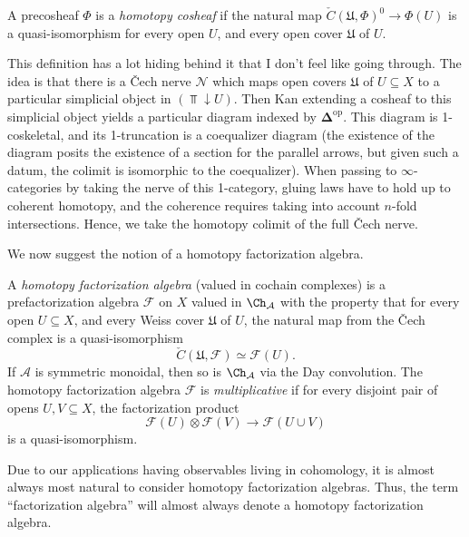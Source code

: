 \begin{definition}\label{dfn:6-1-11}
	A precosheaf $\Phi $ is a \emph{homotopy cosheaf} if the natural map $\check{C}(\mathfrak{U} ,\Phi )^0 \to \Phi (U)$ is a quasi-isomorphism for every open $U$, and every open cover $\mathfrak{U} $ of $U$.
\end{definition}

This definition has a lot hiding behind it that I don't feel like going through. The idea is that there is a \v{C}ech nerve $\mathcal{N} $ which maps open covers $\mathfrak{U} $ of $U\subseteq X$ to a particular simplicial object in $(\Top\downarrow U)$. Then Kan extending a cosheaf to this simplicial object yields a particular diagram indexed by $\boldsymbol{\Delta} ^{\mathrm{op}} $. This diagram is 1-coskeletal, and its 1-truncation is a coequalizer diagram (the existence of the diagram posits the existence of a section for the parallel arrows, but given such a datum, the colimit is isomorphic to the coequalizer). When passing to $\infty $-categories by taking the nerve of this 1-category, gluing laws have to hold up to coherent homotopy, and the coherence requires taking into account $n$-fold intersections. Hence, we take the homotopy colimit of the full \v{C}ech nerve.


We now suggest the notion of a homotopy factorization algebra.

\begin{definition}\label{dfn:6-1-13}
	A \emph{homotopy factorization algebra} (valued in cochain complexes) is a prefactorization algebra $\mathcal{F} $ on $X$ valued in $\Ch_{\mathcal{A} } $ with the property that for every open $U\subseteq X$, and every Weiss cover $\mathfrak{U} $ of $U$, the natural map from the \v{C}ech complex is a quasi-isomorphism
	\[
		\check{C}(\mathfrak{U} ,\mathcal{F} )\simeq \mathcal{F} (U)
	.\]
	If $\mathcal{A} $ is symmetric monoidal, then so is $\Ch_{\mathcal{A} } $ via the Day convolution. The homotopy factorization algebra $\mathcal{F} $ is \emph{multiplicative} if for every disjoint pair of opens $U,V\subseteq X$, the factorization product
	\[
		\mathcal{F} (U)\otimes \mathcal{F} (V)\to \mathcal{F} (U\cup V)
	\]
	is a quasi-isomorphism.
\end{definition}

\begin{remark}\label{rmk:6-1-14}
	Due to our applications having observables living in cohomology, it is almost always most natural to consider homotopy factorization algebras. Thus, the term ``factorization algebra'' will almost always denote a homotopy factorization algebra.
\end{remark}

